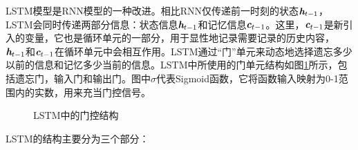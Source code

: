 \vspace{0.5em}
\parinterval LSTM模型是RNN模型的一种改进。相比RNN仅传递前一时刻的状态$\textbf{\em h}_{t-1}$，LSTM会同时传递两部分信息：状态信息$\textbf{\em h}_{t-1}$和记忆信息$\textbf{\em c}_{t-1}$。这里，$\textbf{\em c}_{t-1}$是新引入的变量，它也是循环单元的一部分，用于显性地记录需要记录的历史内容，$\textbf{\em h}_{t-1}$和$\textbf{\em c}_{t-1}$在循环单元中会相互作用。LSTM通过“门”单元来动态地选择遗忘多少以前的信息和记忆多少当前的信息。LSTM中所使用的门单元结构如图\ref{fig:10-11}所示，包括遗忘门，输入门和输出门。图中$\sigma$代表Sigmoid函数，它将函数输入映射为0-1范围内的实数，用来充当门控信号。

\begin{figure}[htp]
\centering
\subfigure[遗忘门]{}
\subfigure[输入门]{}
\subfigure[记忆更新]{}
\subfigure[输出门]{}
\caption{LSTM中的门控结构}
\label{fig:10-11}
\end{figure}

\parinterval LSTM的结构主要分为三个部分：

